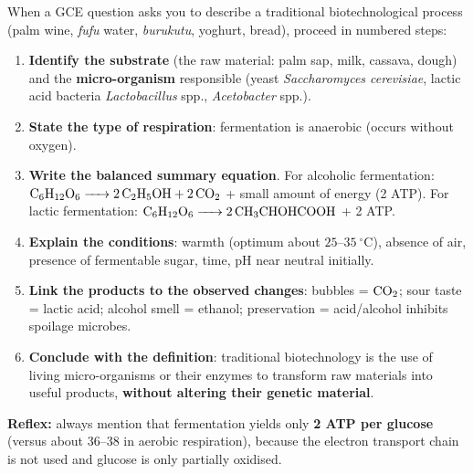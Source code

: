 \documentclass[11pt]{article}
\newcommand{\cle}[1]{{\popxbold\color{popdark}#1}}
\begin{document}
\begin{methode}
When a GCE question asks you to describe a traditional biotechnological process (palm wine, \emph{fufu} water, \emph{burukutu}, yoghurt, bread), proceed in numbered steps:
\begin{enumerate}
\item \textbf{Identify the substrate} (the raw material: palm sap, milk, cassava, dough) and the \textbf{micro-organism} responsible (yeast \emph{Saccharomyces cerevisiae}, lactic acid bacteria \emph{Lactobacillus} spp., \emph{Acetobacter} spp.).
\item \textbf{State the type of respiration}: fermentation is \cle{anaerobic} (occurs without oxygen).
\item \textbf{Write the balanced summary equation}. For alcoholic fermentation: $\ce{C6H12O6 -> 2C2H5OH + 2CO2}$ + small amount of energy (2 ATP). For lactic fermentation: $\ce{C6H12O6 -> 2 CH3CHOHCOOH}$ + 2 ATP.
\item \textbf{Explain the conditions}: warmth (optimum about $25$--$35\ ^\circ\mathrm{C}$), absence of air, presence of fermentable sugar, time, pH near neutral initially.
\item \textbf{Link the products to the observed changes}: bubbles = $\ce{CO2}$; sour taste = lactic acid; alcohol smell = ethanol; preservation = acid/alcohol inhibits spoilage microbes.
\item \textbf{Conclude with the definition}: traditional biotechnology is the use of living micro-organisms or their enzymes to transform raw materials into useful products, \textbf{without altering their genetic material}.
\end{enumerate}
\textbf{Reflex:} always mention that fermentation yields only \textbf{2 ATP per glucose} (versus about 36--38 in aerobic respiration), because the electron transport chain is not used and glucose is only partially oxidised.
\end{methode}
\end{document}
